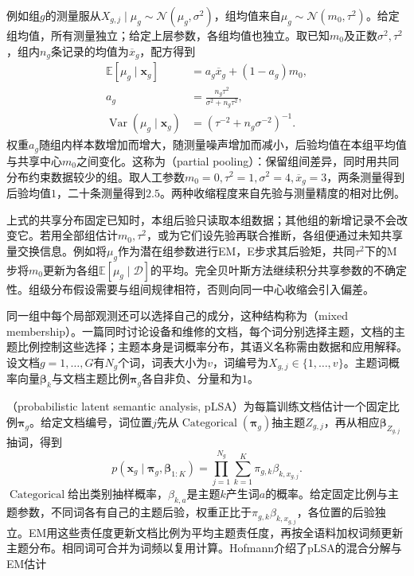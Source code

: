 例如组$g$的测量服从$X_{g,j}\mid\mu_g\sim\mathcal N(\mu_g,\sigma^2)$，组均值来自$\mu_g\sim\mathcal N(m_0,\tau^2)$。给定组均值，所有测量独立；给定上层参数，各组均值也独立。取已知$m_0$及正数$\sigma^2,\tau^2$，组内$n_g$条记录的均值为$\overline x_g$，配方得到
\begin{equation}
  \label{eq:pgm-static-directed-pooling}
  \begin{aligned}
    \mathbb{E}[\mu_g\mid\bm{x}_g]
      &=a_g\overline x_g+(1-a_g)m_0,\\
    a_g&=\frac{n_g\tau^2}{\sigma^2+n_g\tau^2},\\
    \operatorname{Var}(\mu_g\mid\bm{x}_g)
      &=\left(\tau^{-2}+n_g\sigma^{-2}\right)^{-1}.
  \end{aligned}
\end{equation}
权重$a_g$随组内样本数增加而增大，随测量噪声增加而减小，后验均值在本组平均值与共享中心$m_0$之间变化。这称为（partial pooling）：保留组间差异，同时用共同分布约束数据较少的组。取人工参数$m_0=0,\tau^2=1,\sigma^2=4,\overline x_g=3$，两条测量得到后验均值$1$，二十条测量得到$2.5$。两种收缩程度来自先验与测量精度的相对比例。

上式的共享分布固定已知时，本组后验只读取本组数据；其他组的新增记录不会改变它。若用全部组估计$m_0,\tau^2$，或为它们设先验再联合推断，各组便通过未知共享量交换信息。例如将$\mu_g$作为潜在组参数进行EM，E步求其后验矩，共同$\tau^2$下的M步将$m_0$更新为各组$\mathbb E[\mu_g\mid\mathcal D]$的平均。完全贝叶斯方法继续积分共享参数的不确定性。组级分布假设需要与组间规律相符，否则向同一中心收缩会引入偏差。

同一组中每个局部观测还可以选择自己的成分，这种结构称为（mixed membership）。一篇同时讨论设备和维修的文档，每个词分别选择主题，文档的主题比例控制这些选择；主题本身是词概率分布，其语义名称需由数据和应用解释。设文档$g=1,\ldots,G$有$N_g$个词，词表大小为$v$，词编号为$X_{g,j}\in\{1,\ldots,v\}$。主题词概率向量$\bm\beta_k$与文档主题比例$\bm\pi_g$各自非负、分量和为$1$。

（probabilistic latent semantic analysis, pLSA）为每篇训练文档估计一个固定比例$\bm\pi_g$。给定文档编号，词位置$j$先从$\operatorname{Categorical}(\bm\pi_g)$抽主题$Z_{g,j}$，再从相应$\bm\beta_{Z_{g,j}}$抽词，得到
\begin{equation}
  \label{eq:pgm-static-directed-plsa}
  p(\bm{x}_g\mid\bm{\pi}_g,\bm{\beta}_{1:K})
    =\prod_{j=1}^{N_g}
       \sum_{k=1}^{K}\pi_{g,k}\beta_{k,x_{g,j}}.
\end{equation}
$\operatorname{Categorical}$给出类别抽样概率，$\beta_{k,a}$是主题$k$产生词$a$的概率。给定固定比例与主题参数，不同词各有自己的主题后验，权重正比于$\pi_{g,k}\beta_{k,x_{g,j}}$，各位置的后验独立。EM用这些责任度更新文档比例为平均主题责任度，再按全语料加权词频更新主题分布。相同词可合并为词频以复用计算。Hofmann介绍了pLSA的混合分解与EM估计

